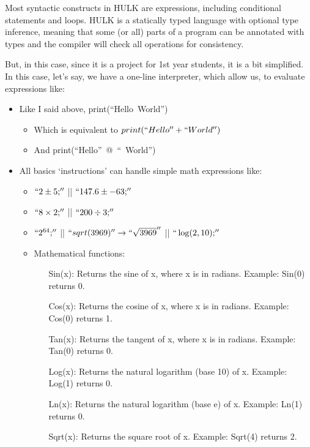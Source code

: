     Most syntactic constructs in HULK are expressions, including conditional statements and loops. HULK is a statically typed language with optional type inference, meaning that some (or all) parts of a program can be annotated with types and the compiler will check all operations for consistency.

     But, in this case, since it is a project for 1st year students, it is a bit simplified.
     In this case, let's say, we have a one-line interpreter, which allow us, to evaluate expressions like:
     \begin{itemize}
        \item Like I said above, \hbox{print{(``Hello World'')}}
            \begin{itemize}
                \item Which is equivalent to \hbox{$print(``Hello'' + `` World'')$}
                \item And \hbox{print{(``Hello'' @ `` World'')}}
            \end{itemize}
        \item All basics `instructions' can handle simple math expressions like:
            \begin{itemize}
                \item $``2 \pm  5;''$ || $``147.6 \pm  -63;''$
                \item $``8 \times  2;''$ || $``200 \div 3;''$
                \item $``2^{64};''$ || $``sqrt(3969)'' \rightarrow  ``\sqrt{3969}''$ || $``\log(2, 10);''$
                \newpage
                \item Mathematical functions:
                    \begin{itemize}
                        \item[Sin{(x)}:] Returns the sine of x, where x is in radians. Example: Sin{(0)} returns 0.
                        \item[Cos{(x)}:] Returns the cosine of x, where x is in radians. Example: Cos{(0)} returns 1.
                        \item[Tan{(x)}:] Returns the tangent of x, where x is in radians. Example: Tan{(0)} returns 0.
                        \item[Log{(x)}:] Returns the natural logarithm (base 10) of x. Example: Log{(1)} returns 0.
                        \item[Ln{(x)}:] Returns the natural logarithm (base e) of x. Example: Ln{(1)} returns 0.
                        \item[Sqrt{(x)}:] Returns the square root of x. Example: Sqrt{(4)} returns 2.

\end{itemize}
\end{itemize}
\end{itemize}
